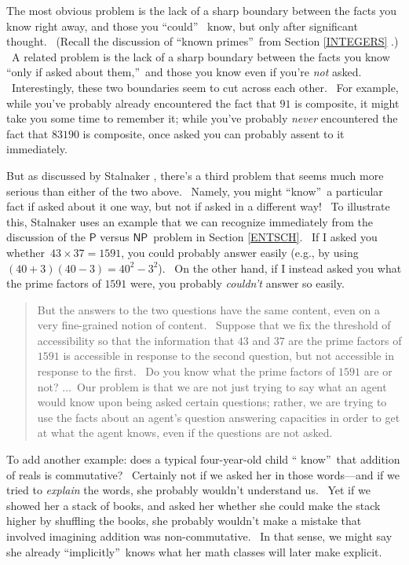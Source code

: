 \documentclass[12pt,onecolumn]{article}%
\begin{document}
The most obvious problem is the lack of a sharp boundary between the facts you
know right away, and those you \textquotedblleft could\textquotedblright%
\ know, but only after significant thought. \ (Recall the discussion of
\textquotedblleft known primes\textquotedblright\ from Section \ref{INTEGERS}%
.) \ A related problem is the lack of a sharp boundary between the facts you
know \textquotedblleft only if asked about them,\textquotedblright\ and those
you know even if you're \textit{not} asked. \ Interestingly, these two
boundaries seem to cut across each other. \ For example, while you've probably
already encountered the fact that $91$ is composite, it might take you some
time to remember it; while you've probably \textit{never} encountered the fact
that $83190$ is composite, once asked you can probably assent to it immediately.

But as discussed by Stalnaker \cite{stalnaker}, there's a third problem that
seems much more serious than either of the two above. \ Namely, you might
\textquotedblleft know\textquotedblright\ a particular fact if asked about it
one way, but not if asked in a different way! \ To illustrate this, Stalnaker
uses an example that we can recognize immediately from the discussion of the
$\mathsf{P}$ versus $\mathsf{NP}$\ problem in Section \ref{ENTSCH}. \ If I
asked you whether\ $43\times37=1591$, you could probably answer easily (e.g.,
by using $\left(  40+3\right)  \left(  40-3\right)  =40^{2}-3^{2}$). \ On the
other hand, if I instead asked you what the prime factors of $1591$ were, you
probably \textit{couldn't} answer so easily.

\begin{quotation}
\noindent But the answers to the two questions have the same content, even on
a very fine-grained notion of content. \ Suppose that we fix the threshold of
accessibility so that the information that $43$ and $37$ are the prime factors
of $1591$ is accessible in response to the second question, but not accessible
in response to the first. \ Do you know what the prime factors of $1591$ are
or not? ...\ Our problem is that we are not just trying to say what an agent
would know upon being asked certain questions; rather, we are trying to use
the facts about an agent's question answering capacities in order to get at
what the agent knows, even if the questions are not asked. \cite[p.
253]{stalnaker}
\end{quotation}

To add another example: does a typical four-year-old child \textquotedblleft
know\textquotedblright\ that addition of reals is commutative? \ Certainly not
if we asked her in those words---and if we tried to \textit{explain} the
words, she probably wouldn't understand us. \ Yet if we showed her a stack of
books, and asked her whether she could make the stack higher by shuffling the
books, she probably wouldn't make a mistake that involved imagining addition
was non-commutative. \ In that sense, we might say she already
\textquotedblleft implicitly\textquotedblright\ knows what her math classes
will later make explicit.
\end{document}
